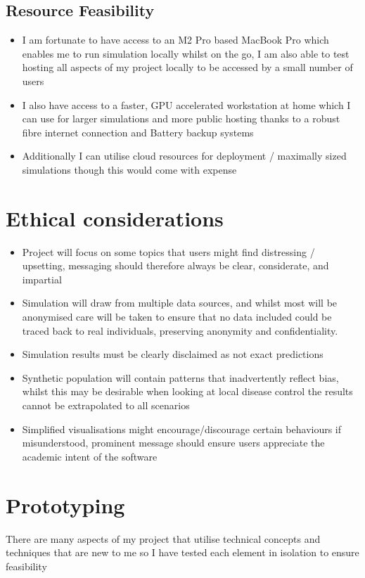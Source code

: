 \subsection{Resource Feasibility}
\begin{itemize}
    \item I am fortunate to have access to an M2 Pro based MacBook Pro which enables me to run simulation locally whilst on the go, I am also able to test hosting all aspects of my project locally to be accessed by a small number of users
    \item I also have access to a faster, GPU accelerated workstation at home which I can use for larger simulations and more public hosting thanks to a robust fibre internet connection and Battery backup systems
    \item Additionally I can utilise cloud resources for deployment / maximally sized simulations though this would come with expense
\end{itemize}
\section{Ethical considerations}
\begin{itemize}
    \item Project will focus on some topics that users might find distressing / upsetting, messaging should therefore always be clear, considerate, and impartial
    \item Simulation will draw from multiple data sources, and whilst most will be anonymised care will be taken to ensure that no data included could be traced back to real individuals, preserving anonymity and confidentiality.
    \item Simulation results must be clearly disclaimed as not exact predictions
    \item Synthetic population will contain patterns that inadvertently reflect bias, whilst this may be desirable when looking at local disease control the results cannot be extrapolated to all scenarios
    \item Simplified visualisations might encourage/discourage certain behaviours if misunderstood, prominent message should ensure users appreciate the academic intent of the software
\end{itemize}
\section{Prototyping}
There are many aspects of my project that utilise technical concepts and techniques that are new to me so I have tested each element in isolation to ensure feasibility
